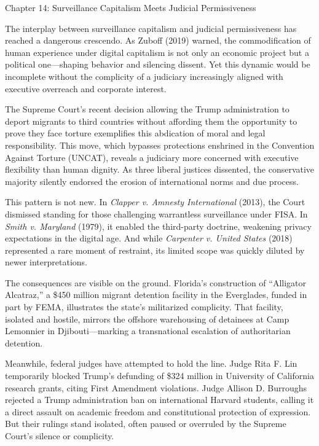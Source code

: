 \documentclass[
]{article}
\author{}
\date{}
\begin{document}
Chapter 14: Surveillance Capitalism Meets Judicial Permissiveness

The interplay between surveillance capitalism and judicial permissiveness has reached a dangerous crescendo. As Zuboff (2019) warned, the commodification of human experience under digital capitalism is not only an economic project but a political one---shaping behavior and silencing dissent. Yet this dynamic would be incomplete without the complicity of a judiciary increasingly aligned with executive overreach and corporate interest.

The Supreme Court's recent decision allowing the Trump administration to deport migrants to third countries without affording them the opportunity to prove they face torture exemplifies this abdication of moral and legal responsibility. This move, which bypasses protections enshrined in the Convention Against Torture (UNCAT), reveals a judiciary more concerned with executive flexibility than human dignity. As three liberal justices dissented, the conservative majority silently endorsed the erosion of international norms and due process.

This pattern is not new. In \emph{Clapper v. Amnesty International} (2013), the Court dismissed standing for those challenging warrantless surveillance under FISA. In \emph{Smith v. Maryland} (1979), it enabled the third-party doctrine, weakening privacy expectations in the digital age. And while \emph{Carpenter v. United States} (2018) represented a rare moment of restraint, its limited scope was quickly diluted by newer interpretations.

The consequences are visible on the ground. Florida's construction of ``Alligator Alcatraz,'' a \$450 million migrant detention facility in the Everglades, funded in part by FEMA, illustrates the state's militarized complicity. That facility, isolated and hostile, mirrors the offshore warehousing of detainees at Camp Lemonnier in Djibouti---marking a transnational escalation of authoritarian detention.

Meanwhile, federal judges have attempted to hold the line. Judge Rita F. Lin temporarily blocked Trump's defunding of \$324 million in University of California research grants, citing First Amendment violations. Judge Allison D. Burroughs rejected a Trump administration ban on international Harvard students, calling it a direct assault on academic freedom and constitutional protection of expression. But their rulings stand isolated, often paused or overruled by the Supreme Court's silence or complicity.
\end{document}
